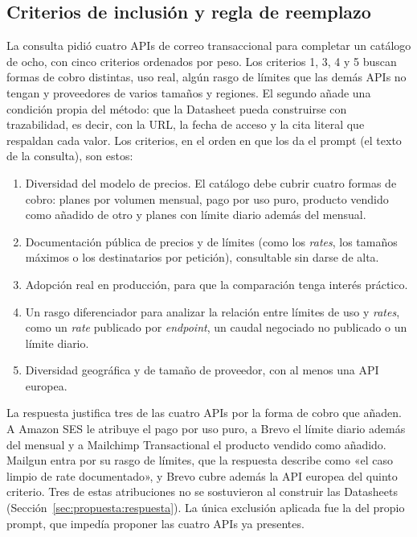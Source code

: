 \subsection{Criterios de inclusión y regla de reemplazo}
\label{sec:propuesta:criterios}

La consulta pidió cuatro APIs de correo transaccional para completar un catálogo de ocho, con cinco criterios ordenados por peso.
Los criterios 1, 3, 4 y 5 buscan formas de cobro distintas, uso real, algún rasgo de límites que las demás APIs no tengan y proveedores de varios tamaños y regiones.
El segundo añade una condición propia del método: que la Datasheet pueda construirse con trazabilidad, es decir, con la URL, la fecha de acceso y la cita literal que respaldan cada valor.
Los criterios, en el orden en que los da el prompt (el texto de la consulta), son estos:
\begin{enumerate}
\item Diversidad del modelo de precios.
El catálogo debe cubrir cuatro formas de cobro: planes por volumen mensual, pago por uso puro, producto vendido como añadido de otro y planes con límite diario además del mensual.
\item Documentación pública de precios y de límites (como los \textit{rates}, los tamaños máximos o los destinatarios por petición), consultable sin darse de alta.
\item Adopción real en producción, para que la comparación tenga interés práctico.
\item Un rasgo diferenciador para analizar la relación entre límites de uso y \textit{rates}, como un \textit{rate} publicado por \textit{endpoint}, un caudal negociado no publicado o un límite diario.
\item Diversidad geográfica y de tamaño de proveedor, con al menos una API europea.
\end{enumerate}

La respuesta justifica tres de las cuatro APIs por la forma de cobro que añaden.
A Amazon SES le atribuye el pago por uso puro, a Brevo el límite diario además del mensual y a Mailchimp Transactional el producto vendido como añadido.
Mailgun entra por su rasgo de límites, que la respuesta describe como «el caso limpio de rate documentado», y Brevo cubre además la API europea del quinto criterio.
Tres de estas atribuciones no se sostuvieron al construir las Datasheets (Sección~\ref{sec:propuesta:respuesta}).
La única exclusión aplicada fue la del propio prompt, que impedía proponer las cuatro APIs ya presentes.

